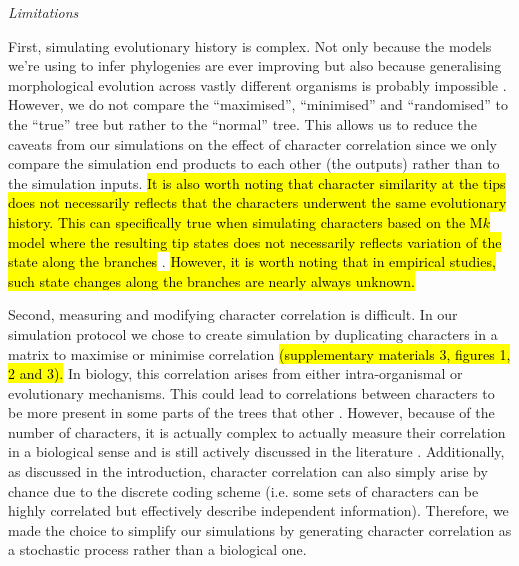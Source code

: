 \documentclass[12pt,letterpaper]{article}
\renewcommand{\subsection}[1]{%
\bigskip
\begin{center}
\begin{large}
\normalfont\itshape #1
\end{large}
\end{center}}
\begin{document}
\subsection{Limitations}
First, simulating evolutionary history is complex.
Not only because the models we're using to infer phylogenies are ever improving \citep[e.g.][]{heath2014fossilized,Wright01072016} but also because generalising morphological evolution across vastly different organisms is probably impossible \citep[see constrasted discussions from][]{GoloboffEmpirical,OReillyEmpirical}.
However, we do not compare the ``maximised'', ``minimised'' and ``randomised'' to the ``true'' tree but rather to the ``normal'' tree.
This allows us to reduce the caveats from our simulations on the effect of character correlation since we only compare the simulation end products to each other (the outputs) rather than to the simulation inputs.
\hl{It is also worth noting that character similarity at the tips does not necessarily reflects that the characters underwent the same evolutionary history.
This can specifically true when simulating characters based on the M$k$ model where the resulting tip states does not necessarily reflects variation of the state along the branches}
 \citep[e.g.][]{revell2014ancestral}.
\hl{However, it is worth noting that in empirical studies, such state changes along the branches are nearly always unknown.}

Second, measuring and modifying character correlation is difficult. 
In our simulation protocol we chose to create simulation by duplicating characters in a matrix to maximise or minimise correlation
\hl{(supplementary materials 3, figures 1, 2 and 3).}
In biology, this correlation arises from either intra-organismal or evolutionary mechanisms.
This could lead to correlations between characters to be more present in some parts of the trees that other \citep[e.g. in the case of inapplicable data ][]{BrazeauNA}.
However, because of the number of characters, it is actually complex to actually measure their correlation in a biological sense and is still actively discussed in the literature \citep{Lande1983,Maddison1990,Pagel1994,Pagel2006,goswami2006morphological,goswami2010,goswami2014macroevolutionary,Grabowski2016}.
Additionally, as discussed in the introduction, character correlation can also simply arise by chance due to the discrete coding scheme (i.e. some sets of characters can be highly correlated but effectively describe independent information).
Therefore, we made the choice to simplify our simulations by generating character correlation as a stochastic process rather than a biological one.
\end{document}
